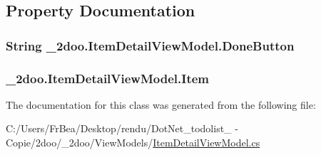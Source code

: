 \subsection{Property Documentation}
\hypertarget{class__2doo_1_1_item_detail_view_model_79e02bd4fc6305e2dc0442f7cdd12f27}{
\subsubsection[{DoneButton}]{\setlength{\rightskip}{0pt plus 5cm}String \_\-2doo.ItemDetailViewModel.DoneButton}}
\label{class__2doo_1_1_item_detail_view_model_79e02bd4fc6305e2dc0442f7cdd12f27}


\hypertarget{class__2doo_1_1_item_detail_view_model_0594aef89a2ce815fbf010db5b3207a7}{
\subsubsection[{Item}]{ \_\-2doo.ItemDetailViewModel.Item}}
\label{class__2doo_1_1_item_detail_view_model_0594aef89a2ce815fbf010db5b3207a7}




The documentation for this class was generated from the following file:\begin{CompactItemize}
\item 
C:/Users/FrBea/Desktop/rendu/DotNet\_\-todolist\_ - Copie/2doo/\_\-2doo/ViewModels/\hyperlink{_item_detail_view_model_8cs}{ItemDetailViewModel.cs}\end{CompactItemize}
